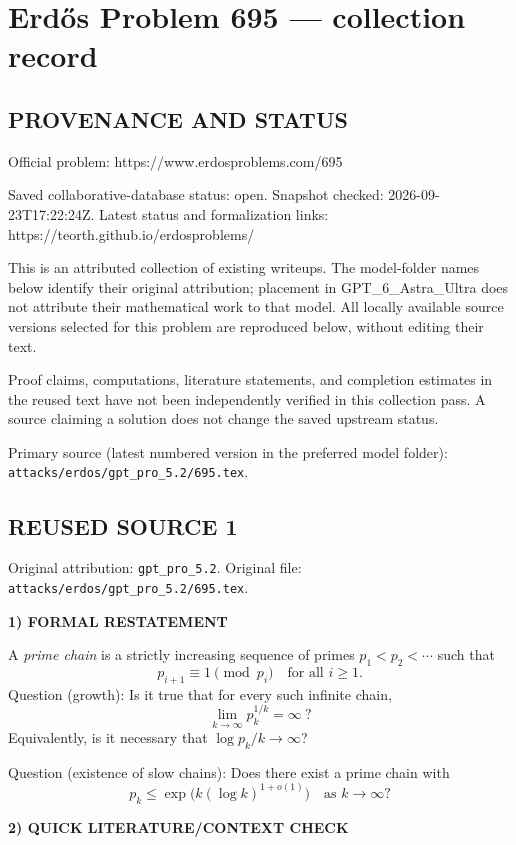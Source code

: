 \section*{Erd\H{o}s Problem 695 --- collection record}

\subsection*{PROVENANCE AND STATUS}
Official problem: https://www.erdosproblems.com/695

Saved collaborative-database status: open.
Snapshot checked: 2026-09-23T17:22:24Z.
Latest status and formalization links: https://teorth.github.io/erdosproblems/

This is an attributed collection of existing writeups. The model-folder names below identify their original attribution; placement in GPT\_6\_Astra\_Ultra does not attribute their mathematical work to that model. All locally available source versions selected for this problem are reproduced below, without editing their text.

Proof claims, computations, literature statements, and completion estimates in the reused text have not been independently verified in this collection pass. A source claiming a solution does not change the saved upstream status.

Primary source (latest numbered version in the preferred model folder): \texttt{attacks/erdos/gpt\_pro\_5.2/695.tex}.

\subsection*{REUSED SOURCE 1}
Original attribution: \texttt{gpt\_pro\_5.2}.
Original file: \texttt{attacks/erdos/gpt\_pro\_5.2/695.tex}.


\noindent\textbf{1) FORMAL RESTATEMENT}

A \emph{prime chain} is a strictly increasing sequence of primes $p_1<p_2<\cdots$ such that
\[
 p_{i+1}\equiv 1\pmod{p_i}\quad\text{for all }i\ge 1.
\]
Question (growth): Is it true that for every such infinite chain,
\[
\lim_{k\to\infty} p_k^{1/k}=\infty\ ?
\]
Equivalently, is it necessary that $\log p_k / k \to \infty$?

Question (existence of slow chains): Does there exist a prime chain with
\[
 p_k\le \exp\big(k(\log k)^{1+o(1)}\big)\quad\text{as }k\to\infty?
\]

\bigskip
\noindent\textbf{2) QUICK LITERATURE/CONTEXT CHECK}

